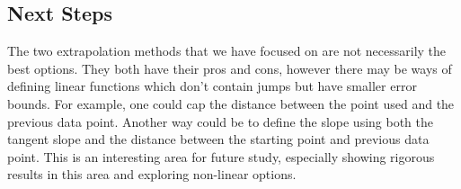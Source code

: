\subsection{Next Steps}%
\label{sub:next_steps}

The two extrapolation methods that we have focused on are not necessarily the best options.
They both have their pros and cons, however there may be ways of defining linear functions which don't contain jumps but have smaller error bounds.
For example, one could cap the distance between the point used and the previous data point.
Another way could be to define the slope using both the tangent slope and the distance between the starting point and previous data point.
This is an interesting area for future study, especially showing rigorous results in this area and exploring non-linear options.

